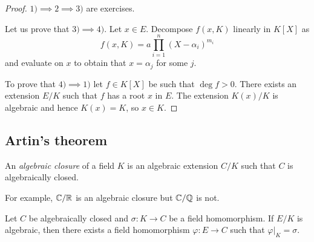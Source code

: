 \begin{proof}
	$1)\implies 2\implies 3)$ are exercises.  
	
	Let us prove that $3)\implies
	4)$. Let $x\in E$. Decompose $f(x,K)$ linearly in $K[X]$ as
	\[
        f(x,K)=a\prod_{i=1}^n(X-\alpha_i)^{m_i}
        \]
        and evaluate on $x$ to obtain that
	$x=\alpha_j$ for some $j$. 
	
	To prove that $4)\implies 1)$ let $f\in K[X]$ be
	such that $\deg f>0$. There exists an extension $E/K$ such that $f$ has a
	root $x$ in $E$. The extension $K(x)/K$ is algebraic and hence $K(x)=K$, so
	$x\in K$. 
\end{proof}



\subsection{Artin's theorem}

\begin{definition}
	An \emph{algebraic closure} of a field $K$ is an algebraic extension $C/K$ 
	such that $C$ is algebraically closed. 
\end{definition}

For example, $\mathbb{C}/\mathbb{R}$ is an algebraic closure but $\mathbb{C}/\mathbb{Q}$ is not. 

\begin{proposition}
\label{pro:Artin}
	Let $C$ be algebraically closed and $\sigma\colon K\to C$ be a field homomorphism. If $E/K$ 
	is algebraic, then there exists a field homomorphism 
	$\varphi\colon E\to C$ such that 
	$\varphi|_K=\sigma$. 
\end{proposition}

